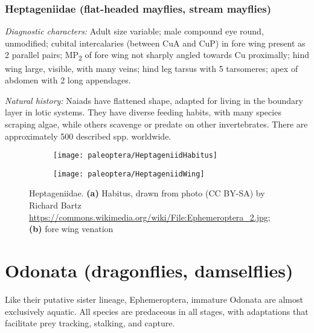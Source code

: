 \subsubsection{Heptageniidae (flat-headed mayflies, stream mayflies)}
\noindent{}\textit{Diagnostic characters:} Adult size variable; male compound eye round, unmodified; cubital intercalaries (between CuA and CuP) in fore wing present as 2 parallel pairs; \texorpdfstring{MP\textsubscript{2}}{ }{ }of fore wing not sharply angled towards Cu proximally; hind wing large, visible, with many veins; hind leg tarsus with 5 tarsomeres; apex of abdomen with 2 long appendages.\vspace{3mm}

\noindent{}\textit{Natural history:} Naiads have flattened shape, adapted for living in the boundary layer in lotic systems. They have diverse feeding habits, with many species scraping algae, while others scavenge or predate on other invertebrates. There are approximately 500 described spp. worldwide.\vspace{3mm}

\begin{figure}[ht!]
    \centering
    \begin{subfigure}[ht!]{0.5\textwidth}
        \texttt{[image: paleoptera/HeptageniidHabitus]}
        \caption{}
        \label{fig:heptageniid1}
    \end{subfigure}
    \hfill
    \begin{subfigure}[ht!]{0.4\textwidth}
        \texttt{[image: paleoptera/HeptageniidWing]}
        \caption{}
        \label{fig:heptageniid2}
    \end{subfigure}
    \caption{Heptageniidae. \textbf{(a)} Habitus, drawn from photo (CC BY-SA) by Richard Bartz \url{https://commons.wikimedia.org/wiki/File:Ephemeroptera_2.jpg}; \textbf{(b)} fore wing venation \citep[redrawn from][Fig. 61]{comstock1918wings}}\label{fig:heptageniid}
\end{figure}

\FloatBarrier

\section{Odonata (dragonflies, damselflies)}
Like their putative sister lineage, Ephemeroptera, immature Odonata are almost exclusively aquatic. All species are predaceous in all stages, with adaptations that facilitate prey tracking, stalking, and capture.\vspace{3mm}%


